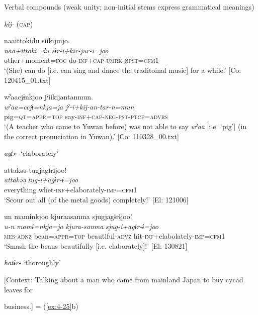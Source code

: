 \ea\label{ex:8-148}
  Verbal compounds (weak unity; non-initial stems express grammatical meanings)

  \textit{kij-} (\textsc{cap})

\ea
{\TM}
\glll  naa{\textbar}ittoki{\textbar}du  siikijuijo.\\
\textit{naa+ittoki=du}  \textit{sɨr-i+kir-jur-i=joo}\\
other+moment=\textsc{foc}  do-\textsc{inf}+\textsc{cap}-\textsc{umrk}-\textsc{npst}=\textsc{cfm1}\\
\glt ‘(She) can do [i.e. can sing and dance the traditoinal music] for a while.’ [Co: 120415\_01.txt]

\ex
{\TM}
\glll  wˀaacjɨnkjoo  jˀiikijantanmun.\\
\textit{wˀaa=ccjɨ=nkja=ja}  \textit{jˀ-i+kij-an-tar-n=mun}\\
pig=\textsc{qt}=\textsc{appr}=\textsc{top}  say-\textsc{inf}+\textsc{cap}-\textsc{neg}-\textsc{pst}-\textsc{ptcp}=\textsc{advrs}\\
\glt ‘(A teacher who came to Yuwan before) was not able to say \textit{wˀaa} [i.e. ‘pig’] (in the correct pronuciation in Yuwan).’ [Co: 110328\_00.txt]
\z

  \textit{agɨr-} ‘elaborately’



{\TM}
\glll  attakəə  tugjagɨrɨjoo!\\
\textit{attakəə}  \textit{tug-i+agɨr-ɨ=joo}\\
everything  whet-\textsc{inf}+elaborately-\textsc{imp}=\textsc{cfm1}\\
\glt ‘Scour out all (of the metal goods) completely!’ [El: 121006]

\ex
{\TM}
\glll  un  mamɨnkjoo  kjuraasanma  sjugjagɨrɨjoo!\\
\textit{u-n}  \textit{mamɨ=nkja=ja}  \textit{kjura-sanma}  \textit{sjug-i+agɨr-ɨ=joo}\\
\textsc{mes}-\textsc{adnz}  bean=\textsc{appr}=\textsc{top}  beautiful-\textsc{advz}  hit-\textsc{inf}+elabolately-\textsc{imp}=\textsc{cfm1}\\
\glt ‘Smash the beans beautifully [i.e. elaborately]!’ [El: 130821]

  \textit{hatɨr-} ‘thoroughly’


\ex{} [Context: Talking about a man who came from mainland Japan to buy cycad leaves for

business.] = (\ref{ex:4-25}b)


